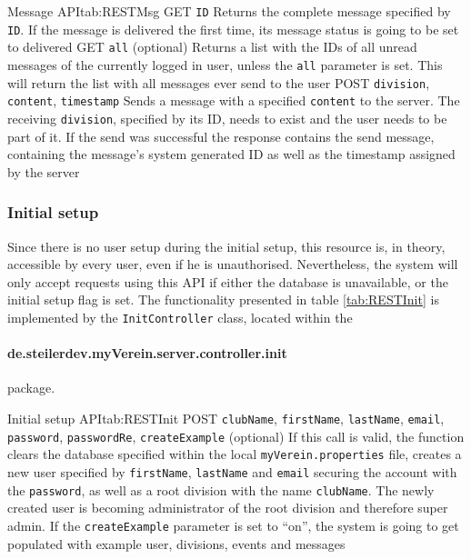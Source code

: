 \begin{RESTTable}{Message API}{tab:RESTMsg}
		{GET}
		{\texttt{ID}}
		{Returns the complete message specified by \texttt{ID}. If the message is delivered the first time, its message status is going to be set to delivered}	
		{GET}
		{\texttt{all} (optional)}
		{Returns a list with the IDs of all unread messages of the currently logged in user, unless the \texttt{all} parameter is set. This will return the list with all messages ever send to the user}
		{POST}
		{\texttt{division}, \texttt{content}, \texttt{timestamp}}
		{Sends a message with a specified \texttt{content} to the server. The receiving \texttt{division}, specified by its ID, needs to exist and the user needs to be part of it. If the send was successful the response contains the send message, containing the message's system generated ID as well as the timestamp assigned by the server}
\end{RESTTable}

\subsubsection{Initial setup}

Since there is no user setup during the initial setup, this resource is, in theory, accessible by every user, even if he is unauthorised. Nevertheless, the system will only accept requests using this \gls{API} if either the database is unavailable, or the initial setup flag is set. The functionality presented in table \vref{tab:RESTInit} is implemented by the \texttt{InitController} class, located within the \paragraph{de.steilerdev.myVerein.server.controller.init} package.

\begin{RESTTable}{Initial setup API}{tab:RESTInit}
		{POST}
		{\texttt{clubName}, \texttt{firstName}, \texttt{lastName}, \texttt{email}, \texttt{password}, \texttt{passwordRe}, \texttt{createExample} (optional)}
		{If this call is valid, the function clears the database specified within the local \texttt{myVerein.properties} file, creates a new user specified by \texttt{firstName}, \texttt{lastName} and \texttt{email} securing the account with the \texttt{password}, as well as a root division with the name \texttt{clubName}. The newly created user is becoming administrator of the root division and therefore super admin. If the \texttt{createExample} parameter is set to \enquote{on}, the system is going to get populated with example user, divisions, events and messages}	
\end{RESTTable}

